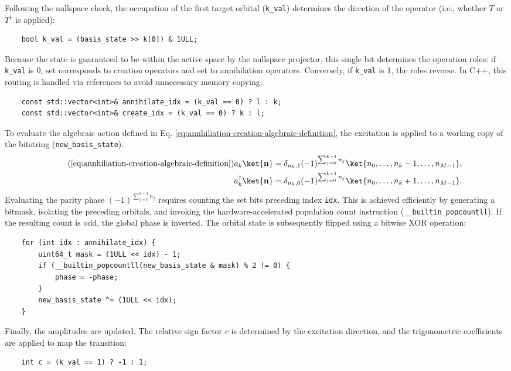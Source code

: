 Following the nullspace check, the occupation of the first target orbital (\texttt{k\_val}) determines the direction of the operator (i.e., whether $T$ or $T^\dagger$ is applied):
\begin{verbatim}
    bool k_val = (basis_state >> k[0]) & 1ULL;
\end{verbatim}
Because the state is guaranteed to be within the active space by the nullspace projector, this single bit determines the operation roles: if \texttt{k\_val} is 0, set  corresponds to creation operators and set  to annihilation operators. Conversely, if \texttt{k\_val} is 1, the roles reverse. In C++, this routing is handled via references to avoid unnecessary memory copying:
\begin{verbatim}
    const std::vector<int>& annihilate_idx = (k_val == 0) ? l : k;
    const std::vector<int>& create_idx = (k_val == 0) ? k : l;
\end{verbatim}

To evaluate the algebraic action defined in Eq. \ref{eq:annhiliation-creation-algebraic-definition}, the excitation is applied to a working copy of the bitstring (\texttt{new\_basis\_state}).
\begin{align} \tag{\ref{eq:annhiliation-creation-algebraic-definition}}
    a_k \ket{\mathbf{n}} &= \delta_{n_k, 1} (-1)^{\sum_{j=0}^{k-1} n_j} \ket{n_0, \dots, n_k - 1, \dots, n_{M-1}}, \\
    a_k^\dagger \ket{\mathbf{n}} &= \delta_{n_k, 0} (-1)^{\sum_{j=0}^{k-1} n_j} \ket{n_0, \dots, n_k + 1, \dots, n_{M-1}}.
\end{align}
Evaluating the parity phase $(-1)^{\sum_{j=0}^{k-1} n_j}$ requires counting the set bits preceding index \texttt{idx}. This is achieved efficiently by generating a bitmask, isolating the preceding orbitals, and invoking the hardware-accelerated population count instruction (\texttt{\_\_builtin\_popcountll}). If the resulting count is odd, the global phase is inverted. The orbital state is subsequently flipped using a bitwise XOR operation:
\begin{verbatim}
    for (int idx : annihilate_idx) {
        uint64_t mask = (1ULL << idx) - 1;
        if (__builtin_popcountll(new_basis_state & mask) % 2 != 0) {
            phase = -phase;
        }
        new_basis_state ^= (1ULL << idx);
    }
\end{verbatim}

Finally, the amplitudes are updated. The relative sign factor $c$ is determined by the excitation direction, and the trigonometric coefficients are applied to map the transition:
\begin{verbatim}
    int c = (k_val == 1) ? -1 : 1;
\end{verbatim}

